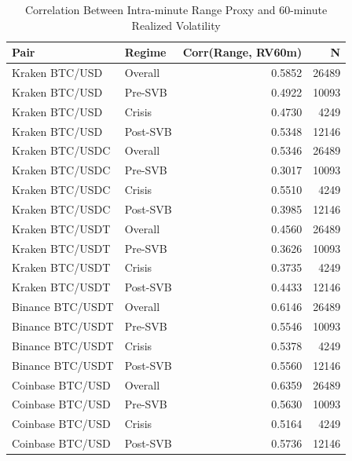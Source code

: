\begin{table}[H]
\caption{Correlation Between Intra-minute Range Proxy and 60-minute Realized Volatility}
\label{tab:range_vol_corr}
\begin{tabular}{llrr}
\toprule
Pair & Regime & Corr(Range, RV60m) & N \\
\midrule
Kraken BTC/USD & Overall & 0.5852 & 26489 \\
Kraken BTC/USD & Pre-SVB & 0.4922 & 10093 \\
Kraken BTC/USD & Crisis & 0.4730 & 4249 \\
Kraken BTC/USD & Post-SVB & 0.5348 & 12146 \\
Kraken BTC/USDC & Overall & 0.5346 & 26489 \\
Kraken BTC/USDC & Pre-SVB & 0.3017 & 10093 \\
Kraken BTC/USDC & Crisis & 0.5510 & 4249 \\
Kraken BTC/USDC & Post-SVB & 0.3985 & 12146 \\
Kraken BTC/USDT & Overall & 0.4560 & 26489 \\
Kraken BTC/USDT & Pre-SVB & 0.3626 & 10093 \\
Kraken BTC/USDT & Crisis & 0.3735 & 4249 \\
Kraken BTC/USDT & Post-SVB & 0.4433 & 12146 \\
Binance BTC/USDT & Overall & 0.6146 & 26489 \\
Binance BTC/USDT & Pre-SVB & 0.5546 & 10093 \\
Binance BTC/USDT & Crisis & 0.5378 & 4249 \\
Binance BTC/USDT & Post-SVB & 0.5560 & 12146 \\
Coinbase BTC/USD & Overall & 0.6359 & 26489 \\
Coinbase BTC/USD & Pre-SVB & 0.5630 & 10093 \\
Coinbase BTC/USD & Crisis & 0.5164 & 4249 \\
Coinbase BTC/USD & Post-SVB & 0.5736 & 12146 \\
\bottomrule
\end{tabular}
\end{table}
